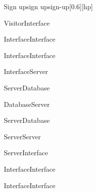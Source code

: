 \begin{sdfig}{Sign up}{sign up}{sign-up}[0.6][hp]
\begin{umlcall}[op={Sign up}]{Visitor}{Interface}
\begin{umlcall}[op={Validate}]{Interface}{Interface}
\begin{umlfragment}[type=alt, label=valid]
\begin{umlcall}[op={Set loading}]{Interface}{Interface}
\begin{umlcall}[op={Sign up}]{Interface}{Server}
\begin{umlcall}[op={Has user}]{Server}{Database}
\begin{umlfragment}[type=alt, label=true]
\begin{umlcall}[type=return,op={No}]{Database}{Server}
\begin{umlcall}[op={Create OTP}]{Server}{Database}
\begin{umlcall}[op={Send email}]{Server}{Server}
                      \begin{umlcall}[type=return,op={Ok}]{Server}{Interface}
                        \begin{umlcall}[op={Show success}]{Interface}{Interface}
                        \end{umlcall}
                      \end{umlcall}
                    \end{umlcall}
                  \end{umlcall}
                \end{umlcall}
              \end{umlfragment}
            \end{umlcall}
          \end{umlcall}
        \end{umlcall}
        \umlfpart[else]
        \begin{umlcall}[op={Show error}]{Interface}{Interface}
        \end{umlcall}
      \end{umlfragment}
    \end{umlcall}
  \end{umlcall}
\end{sdfig}

